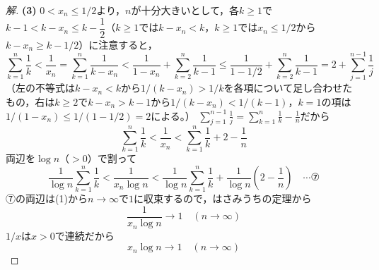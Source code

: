\documentclass[../main.tex]{subfiles}
\begin{document}
\begin{proof}[解]
  \textbf{(3)} $0<x_n\le1/2$より，$n$が十分大きいとして，各$k\ge1$で$k-1<k-x_n\le k-\dfrac12$（$k\ge1$では$k-x_n<k$，$k\ge1$では$x_n\le1/2$から$k-x_n\ge k-1/2$）に注意すると，
  \[
    \sum_{k=1}^n\frac1k<\frac1{x_n}=\sum_{k=1}^n\frac1{k-x_n}<\frac1{1-x_n}+\sum_{k=2}^n\frac1{k-1}\le\frac1{1-1/2}+\sum_{k=2}^n\frac1{k-1}=2+\sum_{j=1}^{n-1}\frac1j
  \]
  （左の不等式は$k-x_n<k$から$1/(k-x_n)>1/k$を各項について足し合わせたもの，右は$k\ge2$で$k-x_n>k-1$から$1/(k-x_n)<1/(k-1)$，$k=1$の項は$1/(1-x_n)\le1/(1-1/2)=2$による。）
  $\displaystyle\sum_{j=1}^{n-1}\frac1j=\sum_{k=1}^n\frac1k-\frac1n$だから
  \[
    \sum_{k=1}^n\frac1k<\frac1{x_n}<\sum_{k=1}^n\frac1k+2-\frac1n
  \]
  両辺を$\log n$（$>0$）で割って
  \[
    \frac1{\log n}\sum_{k=1}^n\frac1k<\frac1{x_n\log n}<\frac1{\log n}\sum_{k=1}^n\frac1k+\frac1{\log n}\left(2-\frac1n\right) \quad\cdots\text{⑦}
  \]
  ⑦の両辺は(1)から$n\to\infty$で$1$に収束するので，はさみうちの定理から
  \[
    \frac1{x_n\log n}\longrightarrow1 \quad(n\to\infty)
  \]
  $1/x$は$x>0$で連続だから
  \[
    x_n\log n\longrightarrow1 \quad(n\to\infty)
  \]
\end{proof}
\end{document}
